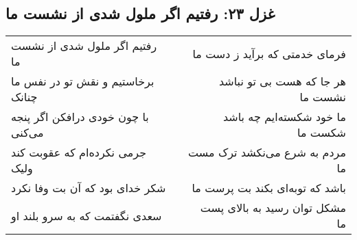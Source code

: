 \begin{center}
\section*{غزل ۲۳: رفتیم اگر ملول شدی از نشست ما}
\label{sec:023}
\begin{longtable}{l p{0.5cm} r}
رفتیم اگر ملول شدی از نشست ما
&&
فرمای خدمتی که برآید ز دست ما
\\
برخاستیم و نقش تو در نفس ما چنانک
&&
هر جا که هست بی تو نباشد نشست ما
\\
با چون خودی درافکن اگر پنجه می‌کنی
&&
ما خود شکسته‌ایم چه باشد شکست ما
\\
جرمی نکرده‌ام که عقوبت کند ولیک
&&
مردم به شرع می‌نکشد ترک مست ما
\\
شکر خدای بود که آن بت وفا نکرد
&&
باشد که توبه‌ای بکند بت پرست ما
\\
سعدی نگفتمت که به سرو بلند او
&&
مشکل توان رسید به بالای پست ما
\\
\end{longtable}
\end{center}
